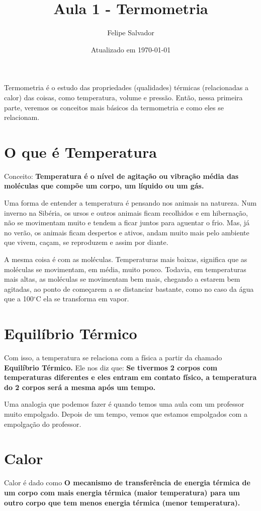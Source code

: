 \documentclass[12pt]{extarticle}
\title{Aula 1 - Termometria}
\author{Felipe Salvador}
\date{Atualizado em \today}
\newcommand{\<}{\langle}
\renewcommand{\>}{\rangle}
\newcommand{\grad}{$^\circ$}
\theoremstyle{definition}
\begin{document}
\maketitle

Termometria é o estudo das propriedades (qualidades) térmicas (relacionadas a calor) das coisas, como temperatura, volume e pressão. Então, nessa primeira parte, veremos os conceitos mais básicos da termometria e como eles se relacionam.

\section{O que é Temperatura}
    Conceito: \textbf{Temperatura é o nível de agitação ou vibração média das moléculas que compõe um corpo, um líquido ou um gás.}
    
    Uma forma de entender a temperatura é pensando nos animais na natureza. Num inverno na Sibéria, os ursos e outros animais ficam recolhidos e em hibernação, não se movimentam muito e tendem a ficar juntos para aguentar o frio. Mas, já no verão, os animais ficam despertos e ativos, andam muito mais pelo ambiente que vivem, caçam, se reproduzem e assim por diante.
    
    A mesma coisa é com as moléculas. Temperaturas mais baixas, significa que as moléculas se movimentam, em média, muito pouco. Todavia, em temperaturas mais altas, as moléculas se movimentam bem mais, chegando a estarem bem agitadas, ao ponto de começarem a se distanciar bastante, como no caso da água que a 100\grad C ela se transforma em vapor.
    
    \section{Equilíbrio Térmico}
    Com isso, a temperatura se relaciona com a física a partir da chamado \textbf{Equilíbrio Térmico.} Ele nos diz que: \textbf{Se tivermos 2 corpos com temperaturas diferentes e eles entram em contato físico, a temperatura do 2 corpos será a mesma após um tempo.}
    
    Uma analogia que podemos fazer é quando temos uma aula com um professor muito empolgado. Depois de um tempo, vemos que estamos empolgados com a empolgação do professor.
    
    \section{Calor}
    Calor é dado como \textbf{O mecanismo de transferência de energia térmica de um corpo com mais energia térmica (maior temperatura) para um outro corpo que tem menos energia térmica (menor temperatura).}
    
\end{document}
